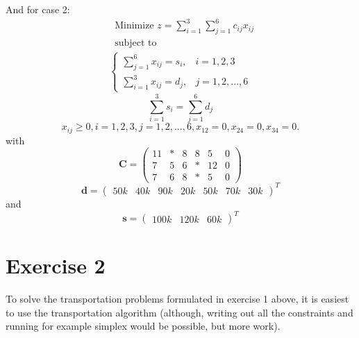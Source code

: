 \documentclass{article}
\begin{document}
  \noindent
  And for case 2:
   \begin{align*}
  & \text{Minimize } z = \sum_{i=1}^{3}\sum_{j=1}^6 c_{ij}x_{ij} \\
  & \text{subject to}
    \label{eq17}
  \end{align*}
  \begin{align}
    \begin{cases}
      \sum_{j=1}^{6} x_{ij} = s_{i}, & i = 1, 2, 3 \\
      \sum_{i=1}^{3} x_{ij} = d_{j}, & j = 1, 2, ..., 6
    \end{cases}
  \end{align}
  \begin{equation}
    \sum_{i=1}^{3} s_{i} = \sum_{j=1}^6 d_{j}
    \label{eq19}
  \end{equation}
  \begin{equation}
    x_{ij} \geq 0, i = 1, 2, 3, j = 1, 2, ..., 6, x_{12} = 0, x_{24} = 0, x_{34} = 0.
    \label{eq20}
  \end{equation}
  with
  \begin{equation}
    \mathbf{C} =
    \begin{pmatrix}
      11 & * & 8 & 8  & 5  & 0\\
      7  & 5 & 6 & *  & 12 & 0\\
      7  & 6 & 8 & *  & 5  & 0
    \end{pmatrix}
    \label{eq21}
  \end{equation}
  \begin{equation}
    \mathbf{d} =
    \begin{pmatrix}
      50k & 40k & 90k & 20k & 50k & 70k & 30k
    \end{pmatrix}^T
    \label{eq22}
  \end{equation}
  and
  \begin{equation}
    \mathbf{s} =
    \begin{pmatrix}
      100k & 120k & 60k
    \end{pmatrix}^T
    \label{eq23}
  \end{equation}

  \section*{Exercise 2}
  To solve the transportation problems formulated in exercise 1 above, it is
  easiest to use the transportation algorithm (although, writing out all the
  constraints and running for example simplex would be possible, but more work).
\end{document}
